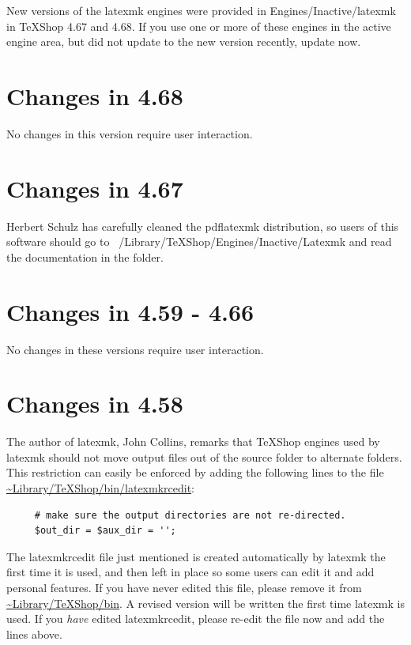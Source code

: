 \documentclass[11pt, oneside]{amsart}
\begin{document}
New versions of the latexmk engines were provided in Engines/Inactive/latexmk in TeXShop 4.67 and 4.68. If you use one or more of these engines in the active engine area, but did not update to the new version recently, update now.


\section{Changes in 4.68}

No changes in this version require user interaction.  


\section{Changes in 4.67}

Herbert Schulz has carefully cleaned the pdflatexmk distribution, so users of this software should go to ~/Library/TeXShop/Engines/Inactive/Latexmk and read the documentation in the folder.

\section{Changes in 4.59 - 4.66}

No changes in these versions require user interaction.  

\section{Changes in 4.58}

The author of latexmk, John Collins, remarks that TeXShop engines used by latexmk should not move output files out of the source folder to alternate folders. This restriction can easily be enforced by adding the following lines to the file \url{~Library/TeXShop/bin/latexmkrcedit}:
\begin{verbatim}
     # make sure the output directories are not re-directed.
     $out_dir = $aux_dir = '';
\end{verbatim}

The latexmkrcedit file just mentioned is created automatically by latexmk the first time it is used, and then left in place so some users can edit it and add personal features. If you have never edited this file, please remove it from
\url{~Library/TeXShop/bin}. A revised version will be written the first time latexmk is used. If you {\em have} edited latexmkrcedit, please re-edit the file now and add the lines above.
\end{document}
